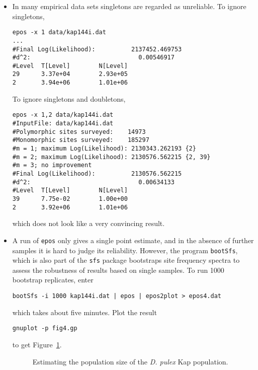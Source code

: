 \documentclass[a4paper, english]{article}
\newcommand{\ty}{\texttt}
\begin{document}
\begin{itemize}
\begin{verbatim}
#d^2:                              0.00380862
#Level  T[Level]        N[Level]
26      4.97e+04        3.76e+05
24      8.78e+04        2.74e+06
6       4.40e+05        5.63e+05
4       2.64e+06        4.12e+06
2       3.05e+06        1.55e+05
\end{verbatim}
which is very similar to the result with the log-likelihood threshold.
\item In many empirical data sets singletons are regarded as
  unreliable. To ignore singletons,
\begin{verbatim}
epos -x 1 data/kap144i.dat 
...
#Final Log(Likelihood):          2137452.469753
#d^2:                              0.00546917
#Level  T[Level]        N[Level]
29      3.37e+04        2.93e+05
2       3.94e+06        1.01e+06
\end{verbatim}
To ignore singletons and doubletons,
\begin{verbatim}
epos -x 1,2 data/kap144i.dat 
#InputFile:	data/kap144i.dat
#Polymorphic sites surveyed:	14973
#Monomorphic sites surveyed:	185297
#m = 1; maximum Log(Likelihood): 2130343.262193	{2}
#m = 2; maximum Log(Likelihood): 2130576.562215	{2, 39}
#m = 3; no improvement
#Final Log(Likelihood):          2130576.562215
#d^2:                              0.00634133
#Level  T[Level]        N[Level]
39      7.75e-02        1.00e+00
2       3.92e+06        1.01e+06
\end{verbatim}
which does not look like a very convincing result.
\item A run of \ty{epos} only gives a single point estimate,
  and in the absence of further samples it is hard to judge its
  reliability. However, the program \ty{bootSfs}, which is also part
  of the \ty{sfs} package bootstraps site frequency spectra to assess the
  robustness of results based on single samples. To run 1000 bootstrap
  replicates, enter
\begin{verbatim}
bootSfs -i 1000 kap144i.dat | epos | epos2plot > epos4.dat
\end{verbatim}
which takes about five minutes. Plot the result
\begin{verbatim}
gnuplot -p fig4.gp
\end{verbatim}
to get Figure~\ref{fig:kap}.
\begin{figure}
  \begin{center}
    \scalebox{0.6}{}
  \end{center}
  \caption{Estimating the population size of the \textit{D. pulex} Kap
    population.}\label{fig:kap}
\end{figure}
\end{itemize}
\end{document}
